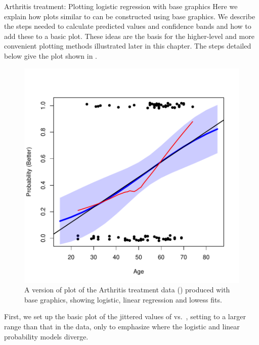\documentclass[11pt]{book}\usepackage[]{graphicx}\usepackage[]{color}
\newenvironment{knitrout}{}{} %
\renewenvironment{knitrout}{\small\renewcommand{\baselinestretch}{.85}}{} %
\begin{document}
\begin{Example}[arthrit7]{Arthritis treatment: Plotting logistic regression with base graphics}
Here we explain 
how plots similar to  can be constructed
using \R base graphics. We describe the steps needed to calculate predicted values and confidence
bands and how to add these to a basic plot.  These ideas are the basis for the higher-level
and more convenient plotting methods illustrated later in this chapter.
The steps detailed below give the plot shown in .

\begin{knitrout}
\color{fgcolor}\begin{figure}[!htbp]


\centerline{\includegraphics[width=.6\textwidth]{ch07/fig/arthritis-age2-1} }

\caption[A version of plot of the Arthritis treatment data produced with R base graphics]{A version of plot of the Arthritis treatment data () produced with \R base graphics, showing logistic, linear regression and lowess fits.\label{fig:arthritis-age2}}
\end{figure}


\end{knitrout}
First, we set up the basic plot of the jittered values
of  vs.\ , setting  to a larger range than
that in the data, only to emphasize where the logistic and linear probability models diverge.


\end{Example}
\end{document}
